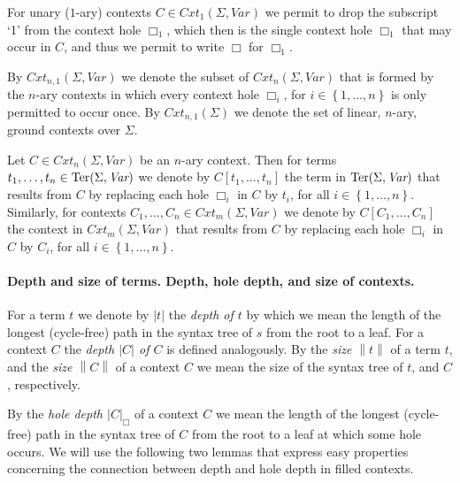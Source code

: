 \documentclass[
submission
]{dmtcs-episciences-tampered}
\newcommand{\fap}[2]{#1({#2})}
\newcommand{\iap}[2]{#1 _{#2}}
\newcommand{\indap}[2]{#1 _{#2}}
\newcommand{\subap}[2]{#1 _{#2}}
\newcommand{\bap}{\subap}
\newcommand{\nb}{\nobreakdash}
\newcommand{\nf}{\normalfont}
\newcommand{\setexp}[1]{\left\{{#1}\right\}}
\newcommand{\ater}{s}
\newcommand{\bter}{t}
\newcommand{\bteri}{\indap{\bter}}
\newcommand{\asig}{\Sigma}
\newcommand{\stermsover}{\text{\nf Ter}}
\newcommand{\termsover}{\fap{\stermsover}}
\newcommand{\scontextsover}{\textit{Cxt}}
\newcommand{\scontextsnover}{\bap{\scontextsover}}
\newcommand{\contextsnover}[1]{\fap{\scontextsnover{#1}}}
\newcommand{\vars}{\textit{Var}}
\newcommand{\cxtap}[2]{{#1}[#2]}
\newcommand{\acxt}{C}
\newcommand{\acxti}{\bap{\acxt}}
\newcommand{\hole}{\Box}
\newcommand{\holei}{\iap{\hole}}
\newcommand{\nary}[1]{{$#1$}\nb-ary}
\newcommand{\sdepth}{\text{\nf d}}
\newcommand{\depth}[1]{\lvert{#1}\rvert} \newcommand{\depthbig}[1]{\big\lvert{#1}\big\rvert} \newcommand{\sudepth}{\indap{\sdepth}{\text{\nf u}}}
\newcommand{\holedepth}[1]{\lvert{#1}\rvert_{\hole}}
\newcommand{\size}[1]{\left\lVert{#1}\right\rVert}
\theoremstyle{plain}
\theoremstyle{definition}
\begin{document}
  For unary (\nary{1}) contexts $\acxt\in\contextsnover{1}{\asig,\vars}$ we permit to drop the subscript `1'
  from the context hole $\holei{1}$, which then is the single context hole $\holei{1}$ that may occur in $\acxt$,
  and thus we permit to write $\hole$ for $\holei{1}$. 
  
  By $\contextsnover{n,1}{\asig,\vars}$ we denote the subset of $\contextsnover{n}{\asig,\vars}$ that is formed
  by the \emph{\underline{}} \nary{n} contexts in which every context hole $\holei{i}$, for $i\in\setexp{1,\ldots,n}$
  is only permitted to occur once. By $\contextsnover{n,1}{\asig}$ we denote the set of linear, \nary{n}, ground contexts over $\asig$.
  
  Let $\acxt\in\contextsnover{n}{\asig,\vars}$ be an \nary{n} context.
  Then for terms $\bteri{1},\ldots,\bteri{n}\in\termsover{\asig,\vars}$
  we denote by $\cxtap{\acxt}{\bteri{1},\ldots,\bteri{n}}$ the term in $\termsover{\asig,\vars}$ 
  that results from $\acxt$ by replacing each hole $\holei{i}$ in $\acxt$ by $\bteri{i}$, for all $i\in\setexp{1,\ldots,n}$.
  Similarly, for contexts $\acxti{1},\ldots,\acxti{n}\in\contextsnover{m}{\asig,\vars}$ 
  we denote by $\cxtap{\acxt}{\acxti{1},\ldots,\acxti{n}}$ the context in $\contextsnover{m}{\asig,\vars}$ 
  that results from $\acxt$ by replacing each hole $\holei{i}$ in $\acxt$ by $\acxti{i}$, for all $i\in\setexp{1,\ldots,n}$.
    
  
\paragraph{Depth and size of terms. Depth, hole depth, and size of contexts.} 
  For a term $\bter$ we denote by $\depth{\bter}$ the \emph{depth of $\bter$}
  by which we mean the length of the longest (cycle-free) path in the syntax tree of $\ater$ from the root to a leaf. 
  For a context $\acxt$ the \emph{depth $\depth{\acxt}$ of $\acxt$} is defined analogously.  
  By the \emph{size $\size{\bter}$} of a term $\bter$, and the \emph{size $\size{\acxt}$} of a context $\acxt$
  we mean the size of the syntax tree of $\bter$, and $\acxt$, respectively. 
  
  By the \emph{hole depth $\holedepth{\acxt}$} of a context $\acxt$
    we mean the length of the longest (cycle-free) path in the syntax tree of $\acxt$ from the root to a leaf at which some hole occurs.
  We will use the following two lemmas that express easy properties concerning the connection between depth and hole depth in
  filled contexts.   
\end{document}
